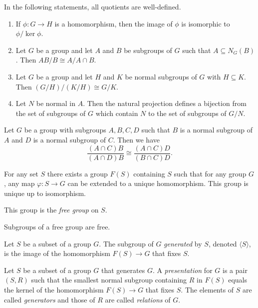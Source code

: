\begin{thm}
    In the following statements, all quotients are well-defined.
    \begin{enumerate}
        \item If $\phi:G\to H$ is a homomorphism, then the image of $\phi$ is
            isomorphic to $\phi/\ker\phi$.
        \item Let $G$ be a group and let $A$ and $B$ be subgroups of $G$ such that
        $A\subseteq N_G(B)$.
        Then $AB/B\cong A/A\cap B$.
        \item Let $G$ be a group and let $H$ and $K$ be normal subgroups of $G$
            with $H\subseteq K$. Then $(G/H)/(K/H)\cong G/K$.
        \item Let $N$ be normal in $A$. Then the natural projection defines a
            bijection from the set of subgroups of $G$ which contain $N$ to the
            set of subgroups of $G/N$.
    \end{enumerate}
\end{thm}
\begin{lem}[Butterfly]
    Let $G$ be a group with subgroups $A,B,C,D$ such that $B$ is a normal
    subgroup of $A$ and $D$ is a normal subgroup of $C$. Then we have
    \[{\frac
    {(A\cap C)B}{(A\cap D)B}}\cong {\frac {(A\cap C)D}{(B\cap C)D}}.\]
\end{lem}
\begin{prop}
    For any set $S$ there exists a group $F(S)$ containing $S$ such that for any
    group $G$, any map $\varphi:S\to G$ can be extended to a unique
    homomorphism. This group is unique up to isomorphism.
\end{prop}
\begin{defn}
    This group is the \emph{free group} on $S$.
\end{defn}
\begin{thm}[Schreier]
    Subgroups of a free group are free.
\end{thm}
\begin{defn}
    Let $S$ be a subset of a group $G$. The subgroup of $G$ \emph{generated} by
    $S$, denoted $\langle S\rangle$, is the image of the homomorphism $F(S)\to
    G$ that fixes $S$.
\end{defn}
\begin{defn}
    Let $S$ be a subset of a group $G$ that generates $G$. A \emph{presentation}
    for $G$ is a pair $(S,R)$ such that the smallest normal subgroup containing
    $R$ in $F(S)$ equals the kernel of the homomorphism $F(S)\to G$ that fixes
    $S$. The
    elements of $S$ are called \emph{generators} and those of $R$ are called
    \emph{relations} of $G$.
\end{defn}

